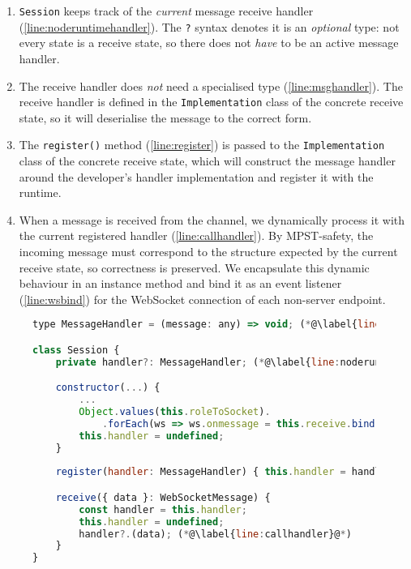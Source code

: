 \begin{enumerate}
\item 
\texttt{Session} keeps track of the \textit{current}
message receive handler (\cref{line:noderuntimehandler}).
The \texttt{?} syntax denotes it is an \textit{optional}
type: not every state is a receive state, so there does not \textit{have} to
be an active message handler.

\item
The receive handler does \textit{not} need a specialised type
(\cref{line:msghandler}). The receive handler is defined in
the \texttt{Implementation} class of the concrete receive state,
so it will deserialise the message to the correct form.

\item
The \texttt{register()} method (\cref{line:register})
is passed to the \texttt{Implementation} class of the concrete
receive state, which will construct the message handler
around the developer's handler implementation and register it
with the runtime.

\item
When a message is received from the channel,
we dynamically process it with 
the current registered handler (\cref{line:callhandler}).
By MPST-safety, the incoming message must correspond
to the structure expected by the current receive state,
so correctness is preserved.
We encapsulate this dynamic behaviour in an instance method
and bind it as an event listener (\cref{line:wsbind})
for the WebSocket connection
of each non-server endpoint.
\end{enumerate}

\begin{figure}[!h]
\begin{lstlisting}[language=javascript,tabsize=2]
type MessageHandler = (message: any) => void; (*@\label{line:msghandler}@*)

class Session {
	private handler?: MessageHandler; (*@\label{line:noderuntimehandler}@*)

	constructor(...) {
		...
		Object.values(this.roleToSocket).
			.forEach(ws => ws.onmessage = this.receive.bind(this)); (*@\label{line:wsbind}@*)
		this.handler = undefined;
	}
	
	register(handler: MessageHandler) { this.handler = handler; } (*@\label{line:register}@*)

	receive({ data }: WebSocketMessage) {
		const handler = this.handler;
		this.handler = undefined;
		handler?.(data); (*@\label{line:callhandler}@*)
	}
}
\end{lstlisting}
\label{lst:noderuntimewsmsg}
\end{figure}

